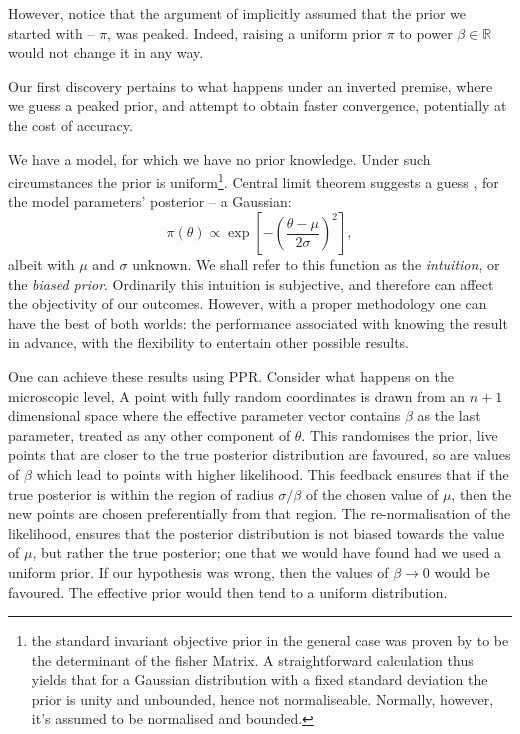 \documentclass[usenatbib]{mnras}
\begin{document}
However, notice that the argument of \citeauthor{chen-ferroz-hobson}
implicitly assumed that the prior we started with -- \(\pi\), was
peaked. Indeed, raising a uniform prior \(\pi\) to power \(\beta \in
   \mathbb{R}\) would not change it in any way.

Our first discovery pertains to what happens under an inverted
premise, where we guess a peaked prior, and attempt to obtain
faster convergence, potentially at the cost of accuracy.

We have a model, for which we have no prior knowledge. Under such
circumstances the prior is uniform\footnote{the standard invariant
objective prior in the general case was proven by
\cite{JeffreysPrior} to be the determinant of the fisher Matrix. A
straightforward calculation thus yields that for a Gaussian
distribution with a fixed standard deviation the prior is unity and
unbounded, hence not normaliseable. Normally, however, it's assumed
to be normalised and bounded.}. Central limit theorem suggests a guess ,
for the model parameters' posterior -- a Gaussian:
\begin{equation}
 \pi (\theta) \propto \exp \left[-\left(\frac{\theta - \mu}{2\sigma}\right)^{2} \right],
\end{equation}
albeit with \(\mu\) and \(\sigma\) unknown. We shall refer to
this function as the \emph{intuition}, or the \emph{biased prior}. Ordinarily
this intuition is subjective, and therefore can affect the
objectivity of our outcomes. However, with a proper methodology one
can have the best of both worlds: the performance associated with
knowing the result in advance, with the flexibility to entertain
other possible results.

One can achieve these results using PPR. Consider what happens on
the microscopic level, A point with fully random coordinates is
drawn from an \(n+1\) dimensional space where the effective
parameter vector contains \(\beta\) as the last parameter, treated
as any other component of \(\theta\). This randomises the prior, live
points that are closer to the true posterior distribution are
favoured, so are values of \(\beta\) which lead to points with
higher likelihood.  This feedback ensures that if the true
posterior is within the region of radius \(\sigma / \beta\) of the
chosen value of \(\mu\), then the new points are chosen
preferentially from that region. The re-normalisation of the
likelihood, ensures that the posterior distribution is not biased
towards the value of \(\mu\), but rather the true posterior; one
that we would have found had we used a uniform prior. If our
hypothesis was wrong, then the values of \(\beta \rightarrow 0\)
would be favoured. The effective prior would then tend to a uniform
distribution.
\end{document}
